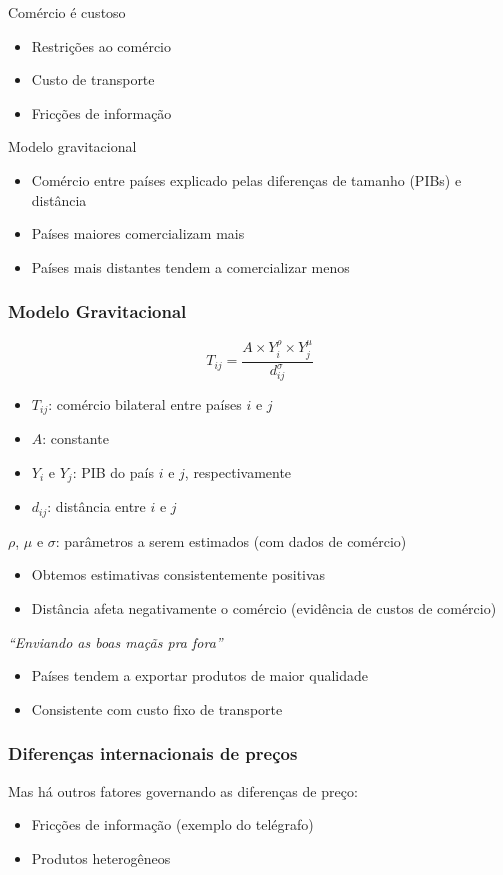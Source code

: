 \documentclass[a4paper,12pt]{article}[abntex2]
\begin{document}
Comércio é custoso
\begin{itemize}
  \item Restrições ao comércio
  \item Custo de transporte
  \item Fricções de informação
\end{itemize}


Modelo gravitacional
\begin{itemize}
  \item Comércio entre países explicado pelas diferenças de tamanho (PIBs) e distância
  \item Países maiores comercializam mais
  \item Países mais distantes tendem a comercializar menos
\end{itemize}

\subsubsection{\textbf{Modelo Gravitacional}}
\[
T_{ij} = \frac{A \times Y_i^{\rho} \times Y_j^{\mu}}{d_{ij}^{\sigma}}
\]

\begin{itemize}
  \item $T_{ij}$: comércio bilateral entre países $i$ e $j$
  \item $A$: constante
  \item $Y_i$ e $Y_j$: PIB do país $i$ e $j$, respectivamente
  \item $d_{ij}$: distância entre $i$ e $j$
\end{itemize}

$\rho$, $\mu$ e $\sigma$: parâmetros a serem estimados (com dados de comércio)
\begin{itemize}
  \item Obtemos estimativas consistentemente positivas
  \item Distância afeta negativamente o comércio (evidência de custos de comércio)
\end{itemize}

\textit{“Enviando as boas maçãs pra fora”}
\begin{itemize}
  \item Países tendem a exportar produtos de maior qualidade
  \item Consistente com custo fixo de transporte
\end{itemize}

\subsubsection{\textbf{Diferenças internacionais de preços}}
Mas há outros fatores governando as diferenças de preço:
\begin{itemize}
  \item Fricções de informação (exemplo do telégrafo)
  \item Produtos heterogêneos
\end{itemize}
\end{document}
